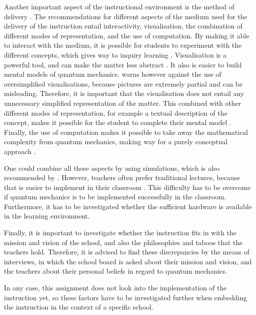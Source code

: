 \documentclass[11pt,twoside]{report} %
\begin{document}
Another important aspect of the instructional environment is the method of delivery \cite{smithragan}. The recommendations for different aspects of the medium used for the delivery of the instruction entail interactivity, visualisation, the combination of different modes of representation, and the use of computation. By making it able to interact with the medium, it is possible for students to experiment with the different concepts, which gives way to inquiry learning \cite{adegoke, asikainen, dori, mckagan}. Visualisation is a powerful tool, and can make the matter less abstract \cite{dori, henriksen, mckagan}. It also is easier to build mental models of quantum mechanics.  warns however against the use of oversimplified visualisations, because pictures are extremely partial and can be misleading. Therefore, it is important that the visualisation does not entail any unnecessary simplified representation of the matter. This combined with other different modes of representation, for example a textual description of the concept, makes it possible for the student to complete their mental model \cite{dori}. Finally, the use of computation makes it possible to take away the mathematical complexity from quantum mechanics, making way for a purely conceptual approach \cite{barnes, mckagan, velentzas}.

One could combine all these aspects by using simulations, which is also recommended by . However, teachers often prefer traditional lectures, because that is easier to implement in their classroom \cite{adegoke}. This difficulty has to be overcome if quantum mechanics is to be implemented successfully in the classroom. Furthermore, it has to be investigated whether the sufficient hardware is available in the learning environment.

Finally, it is important to investigate whether the instruction fits in with the mission and vision of the school, and also the philosophies and taboos that the teachers hold. Therefore, it is advised to find these discrepancies by the means of interviews, in which the school board is asked about their mission and vision, and the teachers about their personal beliefs in regard to quantum mechanics.

In any case, this assignment does not look into the implementation of the instruction yet, so these factors have to be investigated further when embedding the instruction in the context of a specific school.

\end{document}
